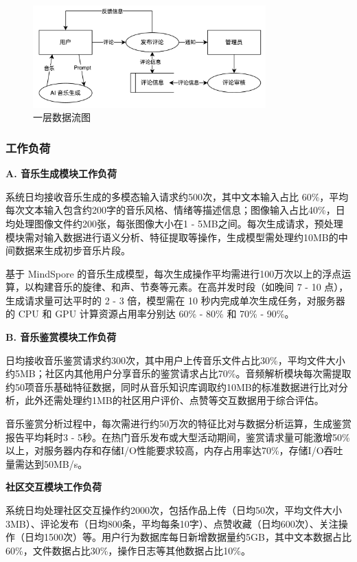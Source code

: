 \documentclass{base}
\numberwithin{figure}{section} %
\begin{document}
\begin{figure}[H]
    \centering
    \includegraphics[width=0.8\textwidth]{images/1-2.png}
    \caption{一层数据流图}
\end{figure}

\subsubsection{工作负荷}

\textbf{A. 音乐生成模块工作负荷}

系统日均接收音乐生成的多模态输入请求约500次，其中文本输入占比 60\%，平均每次文本输入包含约200字的音乐风格、情绪等描述信息；图像输入占比40\%，日均处理图像文件约200张，每张图像大小在1 - 5MB之间。每次生成请求，预处理模块需对输入数据进行语义分析、特征提取等操作，生成模型需处理约10MB的中间数据来生成初步音乐片段。​

基于 MindSpore 的音乐生成模型，每次生成操作平均需进行100万次以上的浮点运算，以构建音乐的旋律、和声、节奏等元素。在高并发时段（如晚间 7 - 10 点），生成请求量可达平时的 2 - 3 倍，模型需在 10 秒内完成单次生成任务，对服务器的 CPU 和 GPU 计算资源占用率分别达 60\% - 80\% 和 70\% - 90\%。​

\textbf{B. 音乐鉴赏模块工作负荷​}

日均接收音乐鉴赏请求约300次，其中用户上传音乐文件占比30\%，平均文件大小约5MB；社区内其他用户分享音乐的鉴赏请求占比70\%。音频解析模块每次需提取约50项音乐基础特征数据，同时从音乐知识库调取约10MB的标准数据进行比对分析，此外还需处理约1MB的社区用户评价、点赞等交互数据用于综合评估。​

音乐鉴赏分析过程中，每次需进行约50万次的特征比对与数据分析运算，生成鉴赏报告平均耗时3 - 5秒。在热门音乐发布或大型活动期间，鉴赏请求量可能激增50\%以上，对服务器内存和存储I/O性能要求较高，内存占用率达70\%，存储I/O吞吐量需达到50MB/s。​

\textbf{社区交互模块工作负荷}

系统日均处理社区交互操作约2000次，包括作品上传（日均50次，平均文件大小3MB）、评论发布（日均800条，平均每条10字）、点赞收藏（日均600次）、关注操作（日均1500次）等。用户行为数据库每日新增数据量约5GB，其中文本数据占比60\%，文件数据占比30\%，操作日志等其他数据占比10\%。​
\end{document}
